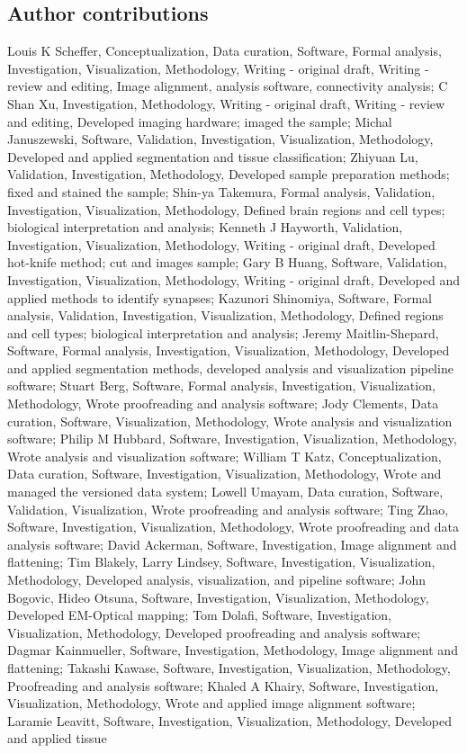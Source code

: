 \documentclass{article}
\begin{document}
\subsection*{Author contributions}

Louis K Scheffer, Conceptualization, Data curation, Software, Formal analysis, Investigation, Visualization, Methodology, Writing - original draft, Writing - review and editing, Image alignment, analysis software, connectivity analysis; C Shan Xu, Investigation, Methodology, Writing - original draft, Writing - review and editing, Developed imaging hardware; imaged the sample; Michal Januszewski, Software, Validation, Investigation, Visualization, Methodology, Developed and applied segmentation and tissue classification; Zhiyuan Lu, Validation, Investigation, Methodology, Developed sample preparation methods; fixed and stained the sample; Shin-ya Takemura, Formal analysis, Validation, Investigation, Visualization, Methodology, Defined brain regions and cell types; biological interpretation and analysis; Kenneth J Hayworth, Validation, Investigation, Visualization, Methodology, Writing - original draft, Developed hot-knife method; cut and images sample; Gary B Huang, Software, Validation, Investigation, Visualization, Methodology, Writing - original draft, Developed and applied methods to identify synapses; Kazunori Shinomiya, Software, Formal analysis, Validation, Investigation, Visualization, Methodology, Defined regions and cell types; biological interpretation and analysis; Jeremy Maitlin-Shepard, Software, Formal analysis, Investigation, Visualization, Methodology, Developed and applied segmentation methods, developed analysis and visualization pipeline software; Stuart Berg, Software, Formal analysis, Investigation, Visualization, Methodology, Wrote proofreading and analysis software; Jody Clements, Data curation, Software, Visualization, Methodology, Wrote analysis and visualization software; Philip M Hubbard, Software, Investigation, Visualization, Methodology, Wrote analysis and visualization software; William T Katz, Conceptualization, Data curation, Software, Investigation, Visualization, Methodology, Wrote and managed the versioned data system; Lowell Umayam, Data curation, Software, Validation, Visualization, Wrote proofreading and analysis software; Ting Zhao, Software, Investigation, Visualization, Methodology, Wrote proofreading and data analysis software; David Ackerman, Software, Investigation, Image alignment and flattening; Tim Blakely, Larry Lindsey, Software, Investigation, Visualization, Methodology, Developed analysis, visualization, and pipeline software; John Bogovic, Hideo Otsuna, Software, Investigation, Visualization, Methodology, Developed EM-Optical mapping; Tom Dolafi, Software, Investigation, Visualization, Methodology, Developed proofreading and analysis software; Dagmar Kainmueller, Software, Investigation, Methodology, Image alignment and flattening; Takashi Kawase, Software, Investigation, Visualization, Methodology, Proofreading and analysis software; Khaled A Khairy, Software, Investigation, Visualization, Methodology, Wrote and applied image alignment software; Laramie Leavitt, Software, Investigation, Visualization, Methodology, Developed and applied tissue 
\end{document}

